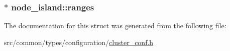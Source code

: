 \subsubsection[{\texorpdfstring{ranges}{ranges}}]{$\ast$ node\+\_\+island\+::ranges}\hypertarget{structnode__island_a78eddc5a37f1f34add0f5cafba4deda5}{}\label{structnode__island_a78eddc5a37f1f34add0f5cafba4deda5}


The documentation for this struct was generated from the following file\+:\begin{DoxyCompactItemize}
\item 
src/common/types/configuration/\hyperlink{cluster__conf_8h}{cluster\+\_\+conf.\+h}\end{DoxyCompactItemize}

